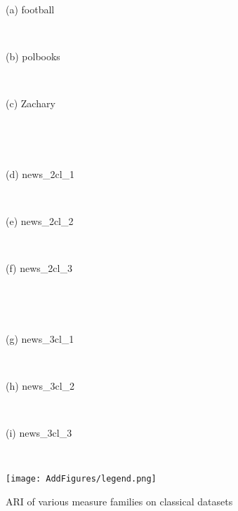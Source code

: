 \documentclass{article}
\begin{document}
\begin{figure}[H]
	\begin{minipage}{.33\textwidth}
		\\\centerline{(a) football}
	\end{minipage}
	\begin{minipage}{.33\textwidth}
		\\\centerline{(b) polbooks}
	\end{minipage}
	\begin{minipage}{.33\textwidth}
		\\\centerline{(c) Zachary}
	\end{minipage}
    \\[10pt]
	\begin{minipage}{.33\textwidth}
		\\\centerline{(d) news\_2cl\_1}
	\end{minipage}
	\begin{minipage}{.33\textwidth}
		\\\centerline{(e) news\_2cl\_2}
	\end{minipage}
	\begin{minipage}{.33\textwidth}
		\\\centerline{(f) news\_2cl\_3}
	\end{minipage}
    \\[10pt]
	\begin{minipage}{.33\textwidth}
		\\\centerline{(g) news\_3cl\_1}
	\end{minipage}
	\begin{minipage}{.33\textwidth}
		\\\centerline{(h) news\_3cl\_2}
	\end{minipage}
	\begin{minipage}{.33\textwidth}
		\\\centerline{(i) news\_3cl\_3}
	\end{minipage}
	\\[10pt]
    \begin{minipage}{\textwidth}
        \hfill\texttt{[image: AddFigures/legend.png]}\hfill
	\end{minipage}
  \caption{\label{f_datasets}ARI of various measure families on classical datasets}
\end{figure}
\end{document}
